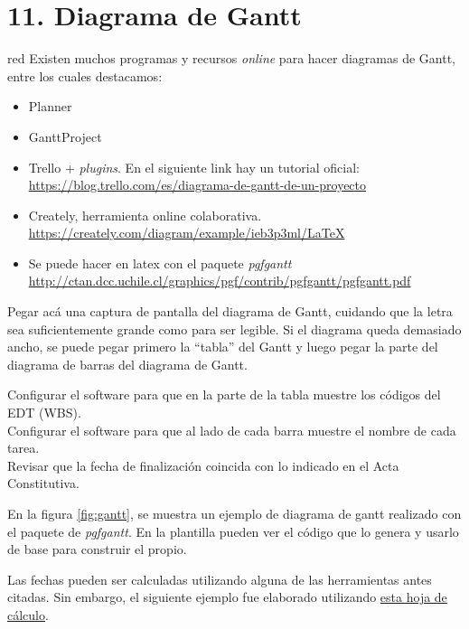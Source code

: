 \documentclass[
11pt, %
]{charter}
\begin{document}
\section{11. Diagrama de Gantt}
\label{sec:gantt}

\begin{consigna}{red}
Existen muchos programas y recursos \textit{online} para hacer diagramas de Gantt, entre los cuales destacamos:

\begin{itemize}
\item Planner
\item GanttProject
\item Trello + \textit{plugins}. En el siguiente link hay un tutorial oficial: \\ \url{https://blog.trello.com/es/diagrama-de-gantt-de-un-proyecto}
\item Creately, herramienta online colaborativa. \\\url{https://creately.com/diagram/example/ieb3p3ml/LaTeX}
\item Se puede hacer en latex con el paquete \textit{pgfgantt}\\ \url{http://ctan.dcc.uchile.cl/graphics/pgf/contrib/pgfgantt/pgfgantt.pdf}
\end{itemize}

Pegar acá una captura de pantalla del diagrama de Gantt, cuidando que la letra sea suficientemente grande como para ser legible. 
Si el diagrama queda demasiado ancho, se puede pegar primero la ``tabla'' del Gantt y luego pegar la parte del diagrama de barras del diagrama de Gantt.

Configurar el software para que en la parte de la tabla muestre los códigos del EDT (WBS).\\
Configurar el software para que al lado de cada barra muestre el nombre de cada tarea.\\
Revisar que la fecha de finalización coincida con lo indicado en el Acta Constitutiva.

En la figura \ref{fig:gantt}, se muestra un ejemplo de diagrama de gantt realizado con el paquete de \textit{pgfgantt}. 
En la plantilla pueden ver el código que lo genera y usarlo de base para construir el propio.

Las fechas pueden ser calculadas utilizando alguna de las herramientas antes citadas. Sin embargo, el siguiente ejemplo
fue elaborado utilizando 
\href{https://docs.google.com/spreadsheets/d/1fBz8NhSpc4tkkhz3KjJCbh1nR_ltDkfEcZi4tZXduqs}{esta hoja de cálculo}.


\end{consigna}
\end{document}
